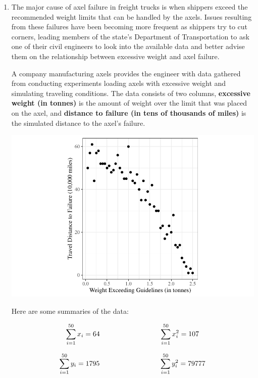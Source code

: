 \documentclass[11pt]{article}\usepackage[]{graphicx}\usepackage[]{color}
\begin{document}
\begin{enumerate}



\item
The major cause of axel failure in freight trucks is when shippers exceed the recommended weight limits that can be handled by the axels. 
Issues resulting from these failures have been becoming more frequent as shippers try to cut corners, 
leading members of the state's Department of Transportation to ask one of their civil engineers 
to look into the available data and better advise them on the relationship between excessive weight and axel failure.

A company manufacturing axels provides the engineer with data gathered from conducting experiments loading axels with excessive weight and simulating traveling conditions.
The data consists of two columns, \textbf{excessive weight (in tonnes)} is the amount of weight over the limit that was placed on the axel, and 
\textbf{distance to failure (in tens of thousands of miles)} is the simulated distance to the axel's failure. 


\begin{center}
\includegraphics{stat305-hw4_sol-003}
\end{center}

Here are some summaries of the data:

$$
\sum_{i=1}^{50} x_i = 64 \hspace{3cm} \sum_{i=1}^{50} x_i^2 = 107 \\
$$

$$
\sum_{i=1}^{50} y_i = 1795 \hspace{3cm} \sum_{i=1}^{50} y_i^2 = 79777 \\
$$


\end{enumerate}
\end{document}
